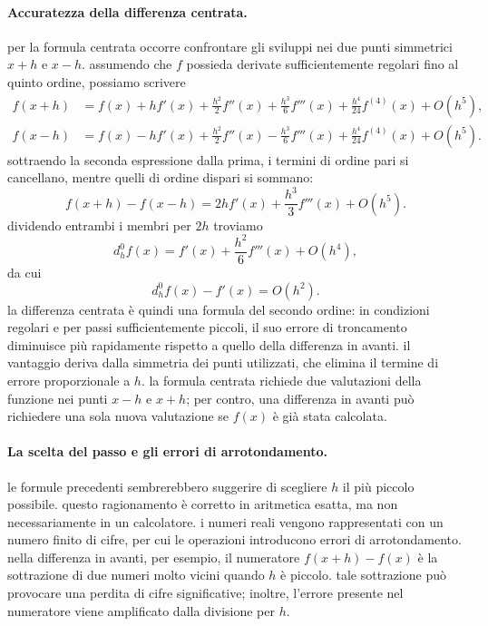 \paragraph{Accuratezza della differenza centrata.}
per la formula centrata occorre confrontare gli sviluppi nei due punti simmetrici $x+h$ e $x-h$. assumendo che $f$ possieda derivate sufficientemente regolari fino al quinto ordine, possiamo scrivere
\begin{align*}
 f(x+h)&=f(x)+hf'(x)+\frac{h^2}{2}f''(x)
 +\frac{h^3}{6}f'''(x)+\frac{h^4}{24}f^{(4)}(x)+O(h^5),\\
 f(x-h)&=f(x)-hf'(x)+\frac{h^2}{2}f''(x)
 -\frac{h^3}{6}f'''(x)+\frac{h^4}{24}f^{(4)}(x)+O(h^5).
\end{align*}
sottraendo la seconda espressione dalla prima, i termini di ordine pari si cancellano, mentre quelli di ordine dispari si sommano:
\begin{equation*}
 f(x+h)-f(x-h)=2hf'(x)+\frac{h^3}{3}f'''(x)+O(h^5).
 \label{eq:taylor_centrata_sottrazione}
\end{equation*}
dividendo entrambi i membri per $2h$ troviamo
\begin{equation*}
 d_h^0f(x)=f'(x)+\frac{h^2}{6}f'''(x)+O(h^4),
 \label{eq:errore_centrata}
\end{equation*}
da cui
\begin{equation*}
 d_h^0f(x)-f'(x)=O(h^2).
 \label{eq:ordine_centrata}
\end{equation*}
la differenza centrata è quindi una formula del secondo ordine: in condizioni regolari e per passi sufficientemente piccoli, il suo errore di troncamento diminuisce più rapidamente rispetto a quello della differenza in avanti. il vantaggio deriva dalla simmetria dei punti utilizzati, che elimina il termine di errore proporzionale a $h$. la formula centrata richiede due valutazioni della funzione nei punti $x-h$ e $x+h$; per contro, una differenza in avanti può richiedere una sola nuova valutazione se $f(x)$ è già stata calcolata.

\paragraph{La scelta del passo e gli errori di arrotondamento.}
le formule precedenti sembrerebbero suggerire di scegliere $h$ il più piccolo possibile. questo ragionamento è corretto in aritmetica esatta, ma non necessariamente in un calcolatore. i numeri reali vengono rappresentati con un numero finito di cifre, per cui le operazioni introducono errori di arrotondamento. nella differenza in avanti, per esempio, il numeratore $f(x+h)-f(x)$ è la sottrazione di due numeri molto vicini quando $h$ è piccolo. tale sottrazione può provocare una perdita di cifre significative; inoltre, l'errore presente nel numeratore viene amplificato dalla divisione per $h$.

